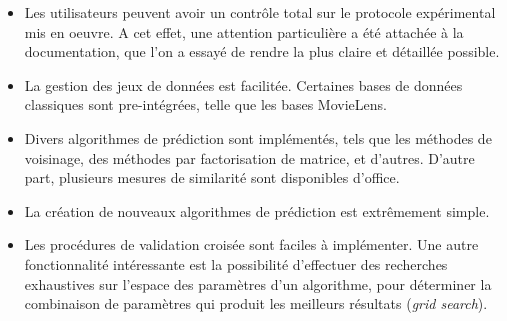 \begin{itemize}
  \item Les utilisateurs peuvent avoir un contrôle total sur le protocole
    expérimental mis en oeuvre. A cet effet, une attention particulière a été
    attachée à la documentation, que l'on a essayé de rendre la plus claire
    et détaillée possible.
  \item La gestion des jeux de données est facilitée. Certaines bases de
    données classiques sont pre-intégrées, telle que les bases MovieLens.
  \item Divers algorithmes de prédiction sont implémentés, tels que les
    méthodes de voisinage, des méthodes par factorisation de matrice, et
    d'autres. D'autre part, plusieurs mesures de similarité sont disponibles
    d'office.
  \item La création de nouveaux algorithmes de prédiction est extrêmement simple.
  \item Les procédures de validation croisée sont faciles à implémenter. Une
    autre fonctionnalité intéressante est la possibilité d'effectuer des
    recherches exhaustives sur l'espace des paramètres d'un algorithme, pour
    déterminer la combinaison de paramètres qui produit les meilleurs résultats
    (\textit{grid search}).
\end{itemize}
